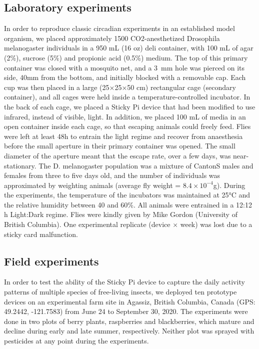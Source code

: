\documentclass[12pt]{article}
\begin{document}
\begin{linenumbers}
		\subsection*{Laboratory experiments}
		In order to reproduce classic circadian experiments in an established model organism, we placed approximately 1500 CO2-anesthetized Drosophila melanogaster individuals in a 950 mL (16 oz) deli container, with 100 mL of agar (2\%), sucrose (5\%) and propionic acid (0.5\%) medium. The top of this primary container was closed with a mosquito net, and a 3~mm hole was pierced on its side, 40mm from the bottom, and initially blocked with a removable cap. Each cup was then placed in a large (25×25×50 cm) rectangular cage (secondary container), and all cages were held inside a temperature-controlled incubator. In the back of each cage, we placed a Sticky Pi device that had been modified to use infrared, instead of visible, light. In addition, we placed 100 mL of media in an open container inside each cage, so that escaping animals could freely feed. Flies were left at least 48h to entrain the light regime and recover from anaesthesia before the small aperture in their primary container was opened. The small diameter of the aperture meant that the escape rate, over a few days, was near-stationary.
		The D. melanogaster population was a mixture of CantonS males and females from three to five days old, and the number of individuals was approximated by weighting animals (average fly weight = $8.4×10^{-4}$g). During the experiments, the temperature of the incubators was maintained at 25°C and the relative humidity between 40 and 60\%. All animals were entrained in a 12:12 h Light:Dark regime. Flies were kindly given by Mike Gordon (University of British Columbia). One experimental replicate (device × week) was lost due to a sticky card malfunction.

		\subsection*{Field experiments}
		In order to test the ability of the Sticky Pi device to capture the daily activity patterns of multiple species of free-living insects, we deployed ten prototype devices on an experimental farm site in Agassiz, British Columbia, Canada (GPS: 49.2442, -121.7583) from June 24 to September 30, 2020. The experiments were done in two plots of berry plants, raspberries and blackberries, which mature and decline during early and late summer, respectively. Neither plot was sprayed with pesticides at any point during the experiments.


\end{linenumbers}
\end{document}
